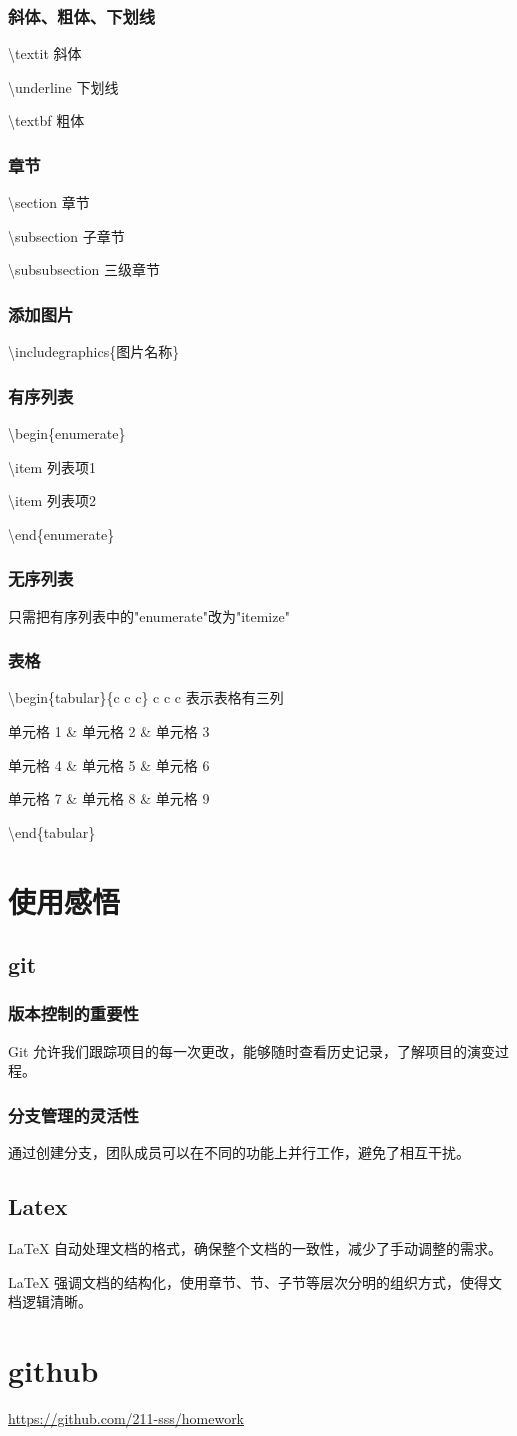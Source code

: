 \documentclass{ctexart}
\begin{document}
\subsubsection{斜体、粗体、下划线}
\textbackslash{}textit
斜体

\textbackslash{}underline
下划线

\textbackslash{}textbf
粗体
\subsubsection{章节}
\textbackslash{}section
章节

\textbackslash{}subsection
子章节

\textbackslash{}subsubsection
三级章节
\subsubsection{添加图片}
\textbackslash{}includegraphics\{图片名称\}
\subsubsection{有序列表}
\textbackslash{}begin\{enumerate\}

\textbackslash{}item
列表项1

\textbackslash{}item
列表项2

\textbackslash{}end\{enumerate\}
\subsubsection{无序列表}
只需把有序列表中的"enumerate"改为"itemize"
\subsubsection{表格}
\textbackslash{}begin\{tabular\}\{c c c\} 
c c c 表示表格有三列

单元格 1 \& 单元格 2  \& 单元格 3

单元格 4 \& 单元格 5  \& 单元格 6

单元格 7 \& 单元格 8  \& 单元格 9

\textbackslash{}end\{tabular\}
\section{使用感悟}
\subsection{git}
\subsubsection{版本控制的重要性}
Git 允许我们跟踪项目的每一次更改，能够随时查看历史记录，了解项目的演变过程。 
\subsubsection{分支管理的灵活性}
通过创建分支，团队成员可以在不同的功能上并行工作，避免了相互干扰。 
\subsection{Latex}
LaTeX 自动处理文档的格式，确保整个文档的一致性，减少了手动调整的需求。 

LaTeX 强调文档的结构化，使用章节、节、子节等层次分明的组织方式，使得文档逻辑清晰。 
\section{github}
\url{https://github.com/211-sss/homework}
\end{document}
